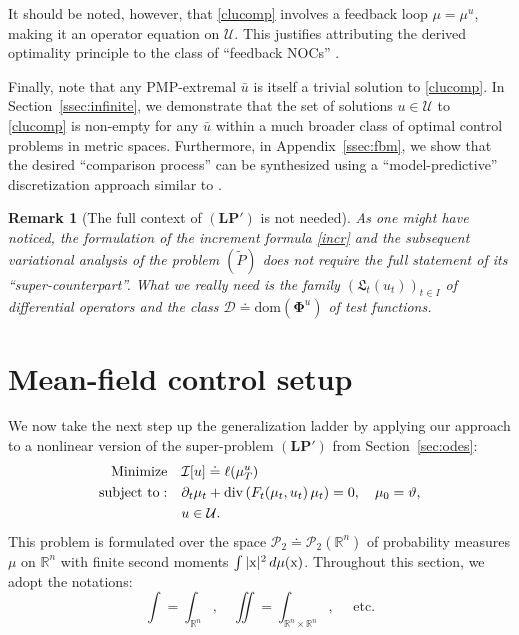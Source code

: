 \documentclass[sn-mathphys-num]{sn-jnl}
\numberwithin{equation}{section}
\theoremstyle{mythm}
\theoremstyle{mydef}
\newtheorem{remark}[proposition]{Remark}
\renewcommand{\d}{\,d}
\newcommand{\dom}{\mathrm{dom}}
\begin{document}
It should be noted, however, that \eqref{clucomp} involves a feedback loop \( \mu = \mu^u \), making it an operator equation on \( \mathcal{U} \). This justifies attributing the derived optimality principle to the class of ``feedback NOCs'' \cite{Dykhta2014}.

Finally, note that any PMP-extremal \( \bar{u} \) is itself a trivial solution to \eqref{clucomp}. In Section~\ref{ssec:infinite}, we demonstrate that the set of solutions \( u \in \mathcal{U} \) to \eqref{clucomp} is non-empty for any \( \bar{u} \) within a much broader class of optimal control problems in metric spaces. Furthermore, in Appendix~\ref{ssec:fbm}, we show that the desired ``comparison process'' can be synthesized using a ``model-predictive'' discretization approach similar to \cite{krasovskii2011game}.


\begin{remark}[The full context of $(\bm{LP}')$ is not needed]\label{re:00}
As one might have noticed, the formulation of the increment formula \eqref{incr} and the subsequent variational analysis of the problem $(\widetilde{P})$ does not require the full statement of its ``super-counterpart''. What we really need is the family $(\mathfrak L_t(u_t))_{t \in I}$ of differential operators and the class \( \bm{\mathcal D} \doteq \dom(\bm \Phi^{u}) \) of test functions.
\end{remark}



\section{Mean-field control setup}
\label{sec:nonloc_cont}

We now take the next step up the generalization ladder by applying our approach to a nonlinear version of the super-problem \( (\bm{LP}') \) from Section~\ref{sec:odes}: 
\begin{align}
  \text{Minimize}\quad & \mathcal I[u] \doteq  \ell(\mu_T^u)\nonumber \\
  \text{subject to}: \quad &\partial_t \mu_t + \mathrm{div}\left(F_t(\mu_t,u_t)\, \mu_t\right) = 0, \quad \mu_0=\vartheta,\label{eq:PDE}\\
  &u\in \mathcal{U}.\notag
\end{align}
This problem is formulated over the space \( \mathcal{P}_2 \doteq \mathcal{P}_2(\mathbb{R}^n) \) of probability measures \( \mu \) on \( \mathbb{R}^n \) with finite second moments \( \int |\mathrm x|^2 \d \mu({\rm x)} \). Throughout this section, we adopt the notations:
$$\int = \int_{\mathbb{R}^n}, \quad \iint = \int_{\mathbb{R}^n \times \mathbb{R}^n},\quad \text{ etc.}
$$ 
\end{document}
